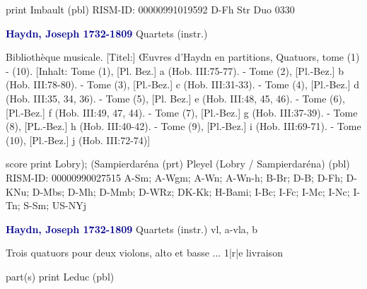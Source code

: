 \documentclass[twocolumn]{book}
\begin{document}
\newline print
\newline Imbault  (pbl)
\newline RISM-ID: 00000991019592
\newline D-Fh  Str Duo 0330
\newline \par \vspace{7pt} \textcolor{darkblue}{\textbf{Haydn, Joseph  1732-1809}}
\newline Quartets (instr.)
\newline \begin{itshape}[Umschlagtitel:] Bibliothèque musicale. [Titel:] Œuvres d'Haydn en partitions, Quatuors, tome (1) - (10). [Inhalt: Tome (1), [Pl. Bez.] a (Hob. III:75-77). - Tome (2), [Pl.-Bez.] b (Hob. III:78-80). - Tome (3), [Pl.-Bez.] c (Hob. III:31-33). - Tome (4), [Pl.-Bez.] d (Hob. III:35, 34, 36). - Tome (5), [Pl. Bez.] e (Hob. III:48, 45, 46). - Tome (6), [Pl.-Bez.] f (Hob. III:49, 47, 44). - Tome (7), [Pl.-Bez.] g (Hob. III:37-39). - Tome (8), [PL.-Bez.] h (Hob. III:40-42). - Tome (9), [Pl.-Bez.] i (Hob. III:69-71). - Tome (10), [Pl.-Bez.] j (Hob. III:72-74)]\end{itshape} 
\newline \textcolor{darkblue}{}  score
\newline print
\newline Lobry); (Sampierdaréna  (prt)
\newline Pleyel (Lobry / Sampierdaréna)  (pbl)
\newline RISM-ID: 00000990027515
\newline A-Sm; A-Wgm; A-Wn; A-Wn-h; B-Br; D-B; D-Fh; D-KNu; D-Mbs; D-Mh; D-Mmb; D-WRz; DK-Kk; H-Bami; I-Bc; I-Fc; I-Mc; I-Nc; I-Tn; S-Sm; US-NYj
\newline \par \vspace{7pt} \textcolor{darkblue}{\textbf{Haydn, Joseph  1732-1809}}
\newline Quartets (instr.)
 vl, a-vla, b
\newline \begin{itshape}Trois quatuors pour deux violons, alto et basse ... 1|r|e livraison\end{itshape} 
\newline \textcolor{darkblue}{}  part(s)
\newline print
\newline Leduc  (pbl)
\end{document}
